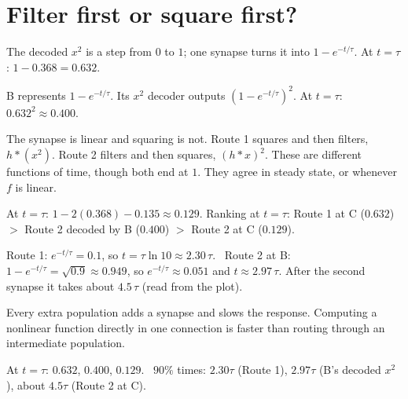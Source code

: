 \documentclass[11pt,letterpaper]{article}
\newcommand{\ans}[1]{\par\vspace{4pt}{\bfseries #1}\quad}
\begin{document}
\section{Filter first or square first?}

\ans{(a)}
The decoded $x^2$ is a step from $0$ to $1$; one synapse turns it into $1 - e^{-t/\tau}$. At $t = \tau$: $1 - 0.368 = 0.632$.

\ans{(b)}
B represents $1 - e^{-t/\tau}$. Its $x^2$ decoder outputs $(1 - e^{-t/\tau})^2$. At $t = \tau$: $0.632^2 \approx 0.400$.

\ans{(c)}
The synapse is linear and squaring is not. Route 1 squares and then filters, $h * (x^2)$. Route 2 filters and then squares, $(h * x)^2$. These are different functions of time, though both end at $1$. They agree in steady state, or whenever $f$ is linear.

\ans{(d)}
At $t = \tau$: $1 - 2(0.368) - 0.135 \approx 0.129$. Ranking at $t = \tau$: Route 1 at C ($0.632$) $>$ Route 2 decoded by B ($0.400$) $>$ Route 2 at C ($0.129$).

\ans{(e)}
Route 1: $e^{-t/\tau} = 0.1$, so $t = \tau \ln 10 \approx 2.30\,\tau$. \
Route 2 at B: $1 - e^{-t/\tau} = \sqrt{0.9} \approx 0.949$, so $e^{-t/\tau} \approx 0.051$ and $t \approx 2.97\,\tau$. After the second synapse it takes about $4.5\,\tau$ (read from the plot).

Every extra population adds a synapse and slows the response. Computing a nonlinear function directly in one connection is faster than routing through an intermediate population.
\begin{center}
\end{center}
\begin{result}
At $t = \tau$: $0.632$, $0.400$, $0.129$. \ $90\%$ times: $2.30\tau$ (Route 1), $2.97\tau$ (B's decoded $x^2$), about $4.5\tau$ (Route 2 at C).
\end{result}
\end{document}

